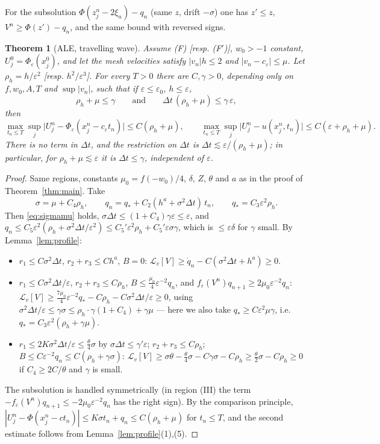 \documentclass[11pt]{amsart}
\newtheorem{theorem}{Theorem}[section]
\theoremstyle{remark}
\newcommand{\ve}{\varepsilon}
\newcommand{\Lop}{\mathcal{L}}
\begin{document}
For the subsolution $\Phi(z^n_j-2\xi_n)-q_n$ (same $z$, drift $-\sigma$) one
has $z'\le z$, $V^n\ge\Phi(z')-q_n$, and the same bound with reversed signs.

\begin{theorem}[ALE, travelling wave]\label{thm:ale}
Assume (F) [resp. (F$'$)], $w_0>-1$ constant, $U^0_j=\Phi_\ve(x^0_j)$, and let
the mesh velocities satisfy $|v_n|h\le2$ and $|v_n-c_\ve|\le\mu$. Let
$\rho_h=h/\ve^2$ [resp. $h^2/\ve^3$]. For every $T>0$ there are $C,\gamma>0$,
depending only on $f,w_0,A,T$ and $\sup|v_n|$, such that if
$\ve\le\ve_0$, $h\le\ve$,
\[
\rho_h+\mu\le\gamma\qquad\text{and}\qquad \Delta t\,(\rho_h+\mu)\le\gamma\,\ve,
\]
then
\[
\max_{t_n\le T}\sup_j\big|U^n_j-\Phi_\ve(x^n_j-c_\ve t_n)\big|\le C(\rho_h+\mu),
\qquad
\max_{t_n\le T}\sup_j\big|U^n_j-u(x^n_j,t_n)\big|\le C(\ve+\rho_h+\mu).
\]
There is no term in $\Delta t$, and the restriction on $\Delta t$ is
$\Delta t\lesssim\ve/(\rho_h+\mu)$; in particular, for $\rho_h+\mu\lesssim\ve$ it is
$\Delta t\le\gamma$, independent of $\ve$.
\end{theorem}

\begin{proof}
Same regions, constants $\mu_0=f(-w_0)/4$, $\delta$, $Z$, $\theta$ and $a$ as in
the proof of Theorem~\ref{thm:main}. Take
\[
\sigma=\mu+C_4\rho_h,\qquad q_n=q_*+C_2(h^a+\sigma^2\Delta t)\,t_n,\qquad q_*=C_3\ve^2\rho_h .
\]
Then \eqref{eq:sigmamu} holds, $\sigma\Delta t\le(1+C_4)\gamma\ve\le\ve$, and
$q_n\le C_5\ve^2(\rho_h+\sigma^2\Delta t/\ve^2)\le C_5'\ve^2\rho_h+C_5'\ve\sigma\gamma$,
which is $\le\ve\delta$ for $\gamma$ small. By Lemma~\ref{lem:profile}:
\begin{itemize}
\item[(I)] $r_1\le C\sigma^2\Delta t$, $r_2+r_3\le Ch^a$, $B=0$: $\Lop_v[V]\ge\dot q_n-C(\sigma^2\Delta t+h^a)\ge0$.
\item[(III)] $r_1\le C\sigma^2\Delta t/\ve$, $r_2+r_3\le C\rho_h$,
$B\le\frac{\mu_0}{4}\ve^{-2}q_n$, and $f_\ve(V^n)q_{n+1}\ge2\mu_0\ve^{-2}q_n$:
$\Lop_v[V]\ge\frac{7\mu_0}4\ve^{-2}q_*-C\rho_h-C\sigma^2\Delta t/\ve\ge0$, using
$\sigma^2\Delta t/\ve\le\gamma\sigma\le\rho_h\cdot\gamma(1+C_4)+\gamma\mu$ --- here
we also take $q_*\ge C\ve^2\mu\gamma$, i.e. $q_*=C_3\ve^2(\rho_h+\gamma\mu)$.
\item[(II)] $r_1\le 2K\sigma^2\Delta t/\ve\le\frac{\theta}{4}\sigma$ by
$\sigma\Delta t\le\gamma'\ve$; $r_2+r_3\le C\rho_h$; $B\le C\ve^{-2}q_n\le C(\rho_h+\gamma\sigma)$:
$\Lop_v[V]\ge\sigma\theta-\frac\theta4\sigma-C\gamma\sigma-C\rho_h\ge\frac\theta2\sigma-C\rho_h\ge0$
if $C_4\ge2C/\theta$ and $\gamma$ is small.
\end{itemize}
The subsolution is handled symmetrically (in region (III) the term
$-f_\ve(V^n)q_{n+1}\le-2\mu_0\ve^{-2}q_n$ has the right sign). By the
comparison principle,
$|U^n_j-\Phi(x^n_j-ct_n)|\le K\sigma t_n+q_n\le C(\rho_h+\mu)$ for $t_n\le T$,
and the second estimate follows from Lemma~\ref{lem:profile}(1),(5).
\end{proof}
\end{document}

